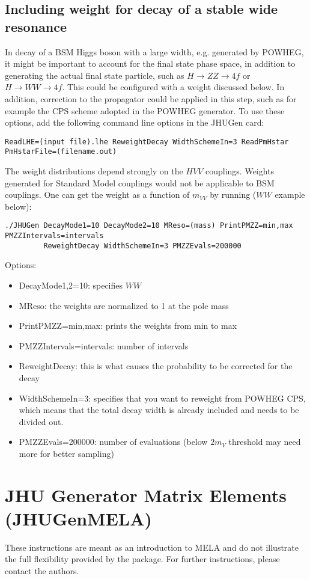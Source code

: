 \documentclass[aps,superscriptaddress,nofootinbib]{revtex4}
\begin{document}
\subsection{Including weight for decay of a stable wide resonance}
In decay of a BSM Higgs boson with a large width, e.g. generated by POWHEG, it might be important 
to account for the final state phase space, in addition to generating the actual final state particle,
such as $H\to ZZ\to 4f$ or $H\to WW\to 4f$. This could be configured with a weight discussed below. 
In addition, correction to the propagator could be applied in this step, such as for example the 
CPS scheme adopted in the POWHEG generator. To use these options, 
add the following command line options in the JHUGen card: 
\begin{verbatim}
ReadLHE=(input file).lhe ReweightDecay WidthSchemeIn=3 ReadPmHstar PmHstarFile=(filename.out)
\end{verbatim}
The weight distributions depend strongly on the $HVV$ couplings. 
Weights generated for Standard Model couplings would not be applicable to BSM couplings. 
One can get the weight as a function of $m_{VV}$ by running ($WW$ example below):
\begin{verbatim}
./JHUGen DecayMode1=10 DecayMode2=10 MReso=(mass) PrintPMZZ=min,max PMZZIntervals=intervals 
         ReweightDecay WidthSchemeIn=3 PMZZEvals=200000
\end{verbatim}
Options:
\begin{itemize}
\item DecayMode1,2=10: specifies $WW$
\item MReso: the weights are normalized to 1 at the pole mass
\item PrintPMZZ=min,max: prints the weights from min to max
\item PMZZIntervals=intervals: number of intervals
\item ReweightDecay: this is what causes the probability to be corrected for the decay
\item WidthSchemeIn=3: specifies that you want to reweight from POWHEG CPS, which means that the total decay width is already included and needs to be divided out.
\item PMZZEvals=200000: number of evaluations (below $2m_V$ threshold may need more for better sampling)
\end{itemize}

\section{JHU Generator Matrix Elements (JHUGenMELA)}
These instructions are meant as an introduction to MELA and do not illustrate the full flexibility provided by the package.  For further instructions, please contact the authors.
\end{document}
